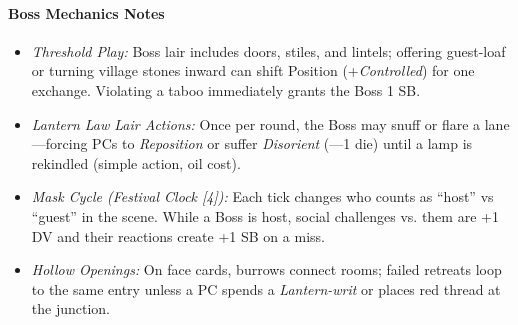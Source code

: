 \paragraph{Boss Mechanics Notes}
\begin{itemize}
  \item \emph{Threshold Play:} Boss lair includes doors, stiles, and lintels; offering guest-loaf or turning village stones inward can shift Position (+\emph{Controlled}) for one exchange. Violating a taboo immediately grants the Boss 1 SB.
  \item \emph{Lantern Law Lair Actions:} Once per round, the Boss may snuff or flare a lane—forcing PCs to \textit{Reposition} or suffer \textit{Disorient} (---1 die) until a lamp is rekindled (simple action, oil cost).
  \item \emph{Mask Cycle (Festival Clock [4]):} Each tick changes who counts as “host” vs “guest” in the scene. While a Boss is host, social challenges vs. them are +1 DV and their reactions create +1 SB on a miss.
  \item \emph{Hollow Openings:} On face cards, burrows connect rooms; failed retreats loop to the same entry unless a PC spends a \emph{Lantern-writ} or places red thread at the junction.
\end{itemize}
